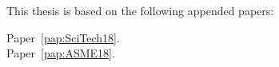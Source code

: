
\begin{refsection}

This thesis is based on the following appended papers:

\begin{description}
  \item[Paper~\ref{pap:SciTech18}.] 

  \item[Paper~\ref{pap:ASME18}.] 
\end{description}

\vspace{1cm}

%
%

\end{refsection}

